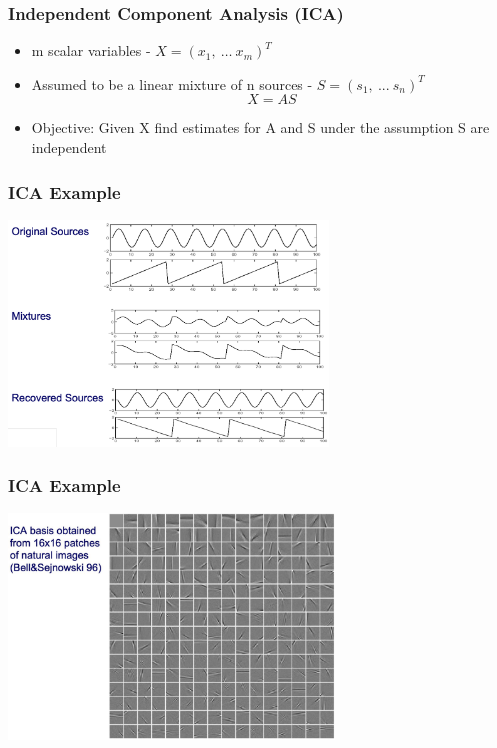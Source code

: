 \documentclass[10pt]{beamer}
\begin{document}
\begin{frame}
  \frametitle{Independent Component Analysis (ICA)}
  \begin{itemize}
  \item m scalar variables - $X = (x_1, ~ \ldots ~ x_m)^T$
  \item Assumed to be a linear mixture of n sources - $S = ( s_1, ~ ... ~ s_n )^T$
    \[
      X = A S
    \]
  \item Objective: Given X find estimates for A and S under the assumption S are independent
  \end{itemize}
\end{frame}

\begin{frame}
  \frametitle{ICA Example}
  \centerline{\includegraphics[height=6cm]{ica-example}}
\end{frame}

\begin{frame}
  \frametitle{ICA Example}
  \centerline{\includegraphics[height=6cm]{ica-example2}}
\end{frame}
\end{document}
